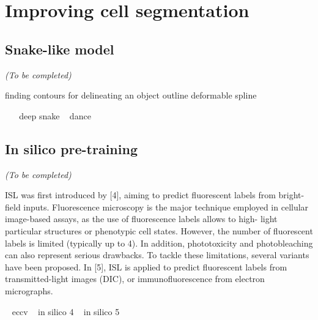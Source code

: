 \section{Improving cell segmentation}
\label{sec:segmentation_improvements}

\subsection{Snake-like model}
\label{subsec:segmentation_snake}

\begin{center}
	\textit{(To be completed)}
\end{center}


finding contours
for delineating an object outline
deformable spline




~\cite{kass_snakes_1988} %
~\cite{Peng_2020_CVPR} deep snake
~\cite{Liu_2021} dance

\subsection{In silico pre-training}
\label{subsec:segmentation_insilico}

\begin{center}
	\textit{(To be completed)}
\end{center}

ISL was first introduced by [4], aiming to predict fluorescent labels from
bright-field inputs. Fluorescence microscopy is the major technique employed
in cellular image-based assays, as the use of fluorescence labels allows to high-
light particular structures or phenotypic cell states. However, the number of
fluorescent labels is limited (typically up to 4). In addition, phototoxicity and
photobleaching can also represent serious drawbacks.
To tackle these limitations, several variants have been proposed. In [5], ISL
is applied to predict fluorescent labels from transmitted-light images (DIC), or
immunofluorescence from electron micrographs.

~\cite{anonymous_Bonte_2022} eccv
~\cite{christiansen_silico_2018} in silico 4
~\cite{ounkomol_label_free_2018} in silico 5

